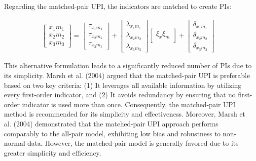 \documentclass[
  man]{apa6}
\begin{document}
Regarding the matched-pair UPI, the indicators are matched to create PIs:

\begin{align}
    \begin{bmatrix}
        x_{1}m_{1} \\
        x_{2}m_{2} \\
        x_{3}m_{3}
    \end{bmatrix} =
    \begin{bmatrix}
        \tau_{x_{1}m_{1}} \\
        \tau_{x_{2}m_{2}} \\ 
        \tau_{x_{3}m_{3}}
    \end{bmatrix} + 
    \begin{bmatrix}
        \lambda_{x_{1}m_{1}} \\
        \lambda_{x_{2}m_{2}} \\ 
        \lambda_{x_{3}m_{3}} 
    \end{bmatrix}
    \begin{bmatrix}
        \xi_{x}\xi_{m} \\
    \end{bmatrix} +
    \begin{bmatrix}
        \delta_{x_{1}m_{1}} \\
        \delta_{x_{2}m_{2}} \\ 
        \delta_{x_{3}m_{3}}
    \end{bmatrix}
\end{align}

This alternative formulation leads to a significantly reduced number of PIs due to its simplicity. Marsh et al. (2004) argued that the matched-pair UPI is preferable based on two key criteria: (1) It leverages all available information by utilizing every first-order indicator, and (2) It avoids redundancy by ensuring that no first-order indicator is used more than once. Consequently, the matched-pair UPI method is recommended for its simplicity and effectiveness. Moreover, Marsh et al. (2004) demonstrated that the matched-pair UPI approach performs comparably to the all-pair model, exhibiting low bias and robustness to non-normal data. However, the matched-pair model is generally favored due to its greater simplicity and efficiency.
\end{document}

